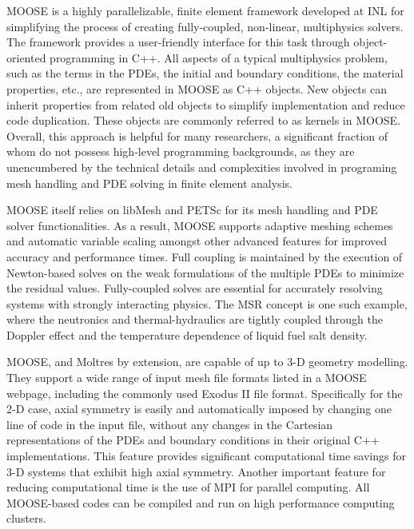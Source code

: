 \gls{MOOSE} \cite{gaston_physics-based_2015} is a highly parallelizable,
finite element framework developed at \gls{INL} for simplifying the process of
creating fully-coupled, non-linear, multiphysics solvers. The framework
provides a user-friendly interface for this task through object-oriented
programming in C++. All aspects of a typical multiphysics problem, such as the
terms in the \glspl{PDE}, the initial and boundary conditions, the material
properties, etc., are represented in \gls{MOOSE} as C++ objects. New objects
can inherit properties from related old objects to simplify implementation and
reduce code duplication. These objects are commonly referred to as kernels in
\gls{MOOSE}. Overall, this approach
is helpful for many researchers, a significant fraction of whom do not possess
high-level programming backgrounds, as they are unencumbered by the
technical details and complexities involved in programing mesh handling
and \gls{PDE} solving in finite element analysis.

\gls{MOOSE} itself relies on libMesh \cite{kirk_libmesh:_2006} and
PETSc \cite{satish_petsc_2019} for its mesh handling and \gls{PDE} solver
functionalities. As a result, \gls{MOOSE} supports adaptive meshing schemes
and automatic variable scaling amongst other advanced features for improved
accuracy and performance times. Full
coupling is maintained by the execution of Newton-based solves on the
weak formulations of the multiple \glspl{PDE} to minimize the residual values.
Fully-coupled solves are essential for accurately resolving systems with
strongly interacting physics. The \gls{MSR} concept is one such example, where
the neutronics and thermal-hydraulics are tightly coupled through the Doppler
effect and the temperature dependence of liquid fuel salt density.

\gls{MOOSE}, and Moltres by extension, are capable of up to 3-D geometry
modelling. They support a wide range of input mesh file formats listed in a
\gls{MOOSE} webpage, including the commonly used Exodus II file format.
Specifically for the 2-D case, axial symmetry is easily and automatically
imposed by changing one line of code in the input file, without any changes in
the Cartesian representations of the \glspl{PDE} and boundary conditions in
their original C++ implementations. This feature provides significant
computational time savings for 3-D systems that exhibit high axial symmetry.
Another important feature for reducing computational time is the use of MPI
for parallel computing. All \gls{MOOSE}-based codes can be compiled and
run on high performance computing clusters.

